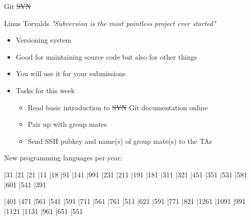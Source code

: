 \begin{slide*}
    Git \sout{SVN}

    Linus Torvalds
    \emph{"Subversion is the most pointless project ever started"}

\begin{itemize}
    \item Versioning system
    \item Good for maintaining source code but also for other things
    \item You will use it for your submissions
    \item Tasks for this week
	\begin{itemize}
            \item Read basic introduction to \sout{SVN} Git documentation online 
      \item Pair up with group mates
      \item Send SSH pubkey and name(s) of group mate(s) to the TAs
	\end{itemize}
\end{itemize} 
\vfill
\end{slide*}

 
\begin{slide*}
New programming languages per year:\\

\begin{barenv}
\setstyle{\scriptsize}
\bar{3}{1}
\bar{2}{1}
\bar{2}{1}
\bar{1}{1}
\bar{1}{8}
\bar{9}{1}
\bar{14}{1}
\bar{99}{1}
\bar{23}{1}
\bar{21}{1}
\bar{19}{1}
\bar{18}{1}
\bar{31}{1}
\bar{32}{1}
\bar{45}{1}
\bar{35}{1}
\bar{53}{1}
\bar{58}{1}
\bar{60}{1}
\bar{54}{1}
\bar{39}{1}
\end{barenv}
\vspace{8mm}
\begin{barenv}
\setstyle{\scriptsize}
\bar{40}{1}
\bar{47}{1}
\bar{56}{1}
\bar{54}{1}
\bar{59}{1}
\bar{71}{1}
\bar{56}{1}
\bar{76}{1}
\bar{51}{1}
\bar{62}{1}
\bar{59}{1}
\bar{77}{1}
\bar{82}{1}
\bar{126}{1}
\bar{109}{1}
\bar{99}{1}
\bar{112}{1}
\bar{113}{1}
\bar{96}{1}
\bar{65}{1}
\bar{55}{1}
\end{barenv}
\vfil
\end{slide*}

